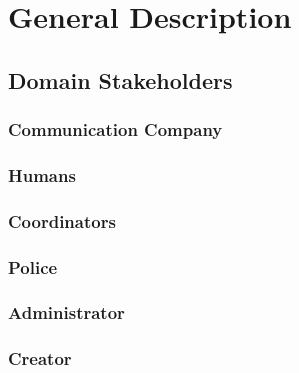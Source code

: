
\chapter{General Description}
\label{chap:general_description}



\section{Domain Stakeholders}
\label{sec:lu.uni.lassy.excalibur.examples.icrash-gendescr-stakeholders}


\subsection{Communication Company}


\subsection{Humans}


\subsection{Coordinators}


\subsection{Police}


\subsection{Administrator}


\subsection{Creator}


